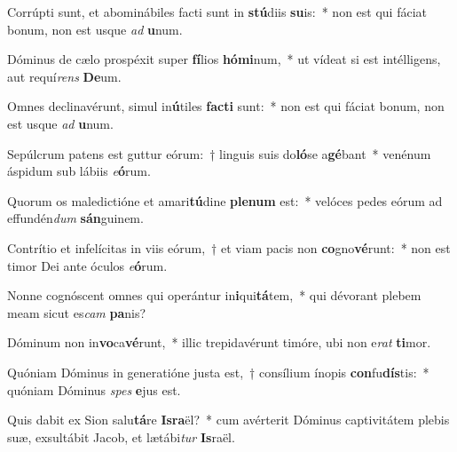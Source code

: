 \item Corrúpti sunt, et abominábiles facti sunt in \textbf{stú}diis \textbf{su}is:~* non est qui fáciat bonum, non est usque \textit{ad} \textbf{u}num.
\item Dóminus de cælo prospéxit super \textbf{fí}lios \textbf{hó}\textbf{mi}num,~* ut vídeat si est intélligens, aut requí\textit{rens} \textbf{De}um.
\item Omnes declinavérunt, simul in\textbf{ú}tiles \textbf{fac}\textbf{ti} sunt:~* non est qui fáciat bonum, non est usque \textit{ad} \textbf{u}num.
\item Sepúlcrum patens est guttur eórum:~† linguis suis do\textbf{ló}se a\textbf{gé}bant~* venénum áspidum sub lábiis \textit{e}\textbf{ó}rum.
\item Quorum os maledictióne et amari\textbf{tú}dine \textbf{ple}\textbf{num} est:~* velóces pedes eórum ad effundén\textit{dum} \textbf{sán}guinem.
\item Contrítio et infelícitas in viis eórum,~† et viam pacis non \textbf{co}gno\textbf{vé}runt:~* non est timor Dei ante óculos \textit{e}\textbf{ó}rum.
\item Nonne cognóscent omnes qui operántur in\textbf{i}qui\textbf{tá}tem,~* qui dévorant plebem meam sicut es\textit{cam} \textbf{pa}nis?
\item Dóminum non in\textbf{vo}ca\textbf{vé}runt,~* illic trepidavérunt timóre, ubi non e\textit{rat} \textbf{ti}mor.
\item Quóniam Dóminus in generatióne justa est,~† consílium ínopis \textbf{con}fu\textbf{dís}tis:~* quóniam Dóminus \textit{spes} \textbf{e}jus est.
\item Quis dabit ex Sion salu\textbf{tá}re \textbf{Is}\textbf{ra}ël?~* cum avérterit Dóminus captivitátem plebis suæ, exsultábit Jacob, et lætábi\textit{tur} \textbf{Is}raël.
